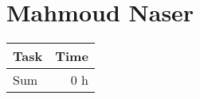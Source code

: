 \clearpage
\section*{Mahmoud Naser}
\begin{table}[h!tpb]
  \centering
  \begin{tabularx}{\textwidth}{X r}
    \toprule
      Task & Time \\
    \midrule
    \midrule
      Sum & 0 h \\
    \bottomrule
  \end{tabularx}
\end{table}
